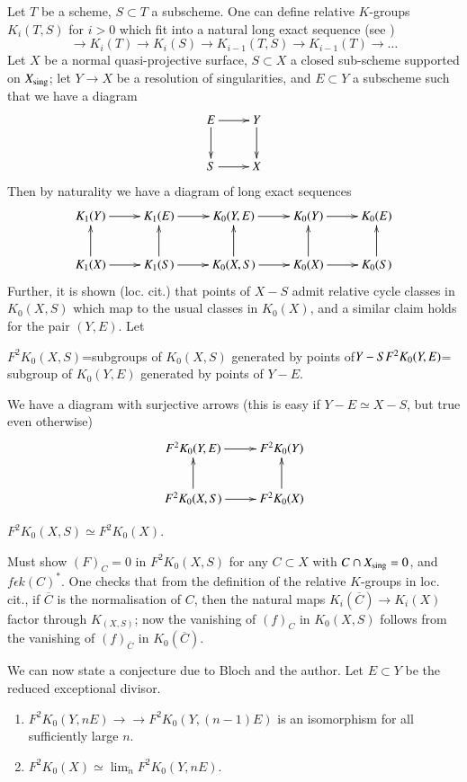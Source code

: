 Let $T$ be a scheme, $S\subset T$ a subscheme. One can define relative $K$-groups $K_i(T,S)$ for $i>0$ which fit into a natural long exact sequence (see \cite[appendix]{Coombes})
$$
\to K_i(T)\to K_i(S)\to K_{i-1}(T,S)\to K_{i-1}(T)\to\ldots  
$$
Let $X$ be a normal quasi-projective surface, $S\subset X$ a closed sub-scheme supported on $X_{\mathrm{sing}}$; let $Y\to X$ be a resolution of singularities, and $E\subset Y$ a subscheme such that we have a diagram 
$$
\xymatrix{E\ar[r]\ar[d]& Y\ar[d]\\
S\ar[r]&X}
$$
Then by naturality we have a diagram of long exact sequences 
$$
\xymatrix{K_1(Y)\ar[r]& K_1(E)\ar[r]&K_0(Y,E)\ar[r]& K_0(Y)\ar[r]& K_0(E)\\
K_1(X)\ar[u]\ar[r]& K_1(S)\ar[u]\ar[r]&K_0(X,S)\ar[u]\ar[r]& K_0(X)\ar[u]\ar[r]& K_{0}(S)\ar[u]}
$$
Further, it is shown (loc. cit.) that points of $X-S$ admit relative cycle classes in $K_0(X,S)$ which map to the usual classes in $K_0(X)$, and a similar claim holds for the pair $(Y,E)$. Let 

$F^{2}K_0(X,S)$=subgroups of $K_0(X,S)$ generated by points of\pageoriginale $Y-S F^{2}\\K_0(Y,E)$= subgroup of $K_0(Y,E)$ generated by points of $Y-E$. 

We have a diagram with surjective arrows (this is easy if $Y-E\simeq X -S$, but true even otherwise)
$$
\xymatrix{F^{2}K_0(Y, E)\ar[r]& F^{2}K_0(Y)\\
F^{2}K_0\ar[u](X,S)\ar[r]& F^{2}K_0(X)\ar[u]}
$$

\begin{cl}
$F^{2}K_0(X,S)\simeq F^{2}K_0(X)$. 
\end{cl}

\begin{ip}
Must show $(F)_C=0$ in $F^{2}K_0(X,S)$ for any $C\subset X$ with $C\cap X_{\mathrm{sing}}=0$, and $f\epsilon k(C)^{\ast}$. One checks that from the definition of the relative $K$-groups in loc. cit., if $\overline{C}$ is the normalisation of $C$, then the natural maps $K_i(\overline{C})\to K_i(X)$ factor through $K_(X, S)$; now the vanishing of $(f)_C$ in $K_0(X,S)$ follows from the vanishing of $(f)_{\overline{C}}$ in $K_0(\overline{C})$. 
\end{ip}

We can now state a conjecture due to Bloch and the author. Let $E\subset Y$ be the reduced exceptional divisor. 

\begin{con}
\begin{enumerate}
\renewcommand{\theenumi}{\roman{enumi}}
\renewcommand{\labelenumi}{(\theenumi)}
\item $F^{2}K_0(Y, nE)\to\to F^{2}K_0(Y, (n-1)E)$ is an isomorphism for all sufficiently large $n$. 
\item $F^{2}K_0(X)\simeq \displaystyle\mathop{\lim}_{\overleftarrow{n}} F^{2}K_0(Y, nE)$. 
\end{enumerate}
\end{con}

